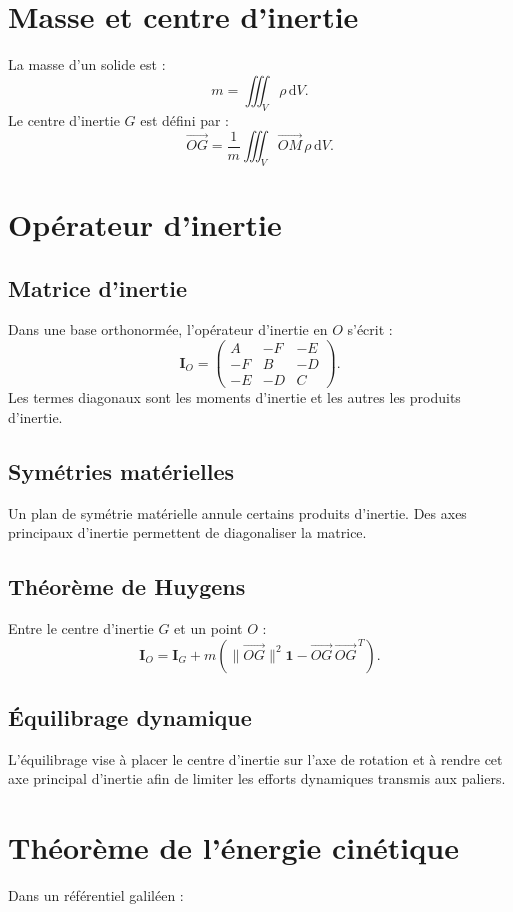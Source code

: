 \section{Masse et centre d'inertie}
La masse d'un solide est :
\[
m=\iiint_V \rho\,\mathrm dV.
\]
Le centre d'inertie $G$ est défini par :
\[
\overrightarrow{OG}=\frac1m\iiint_V \overrightarrow{OM}\,\rho\,\mathrm dV.
\]

\section{Opérateur d'inertie}
\subsection{Matrice d'inertie}
Dans une base orthonormée, l'opérateur d'inertie en $O$ s'écrit :
\[
\mathbf I_O=
\begin{pmatrix}
A&-F&-E\\
-F&B&-D\\
-E&-D&C
\end{pmatrix}.
\]
Les termes diagonaux sont les moments d'inertie et les autres les produits d'inertie.

\subsection{Symétries matérielles}
Un plan de symétrie matérielle annule certains produits d'inertie. Des axes principaux d'inertie permettent de diagonaliser la matrice.

\subsection{Théorème de Huygens}
Entre le centre d'inertie $G$ et un point $O$ :
\[
\mathbf I_O=\mathbf I_G+m\left(\|\overrightarrow{OG}\|^2\mathbf 1-\overrightarrow{OG}\,\overrightarrow{OG}^{\,T}\right).
\]

\subsection{Équilibrage dynamique}
L'équilibrage vise à placer le centre d'inertie sur l'axe de rotation et à rendre cet axe principal d'inertie afin de limiter les efforts dynamiques transmis aux paliers.

\section{Théorème de l'énergie cinétique}
Dans un référentiel galiléen :
\TLEnergiePuissance

